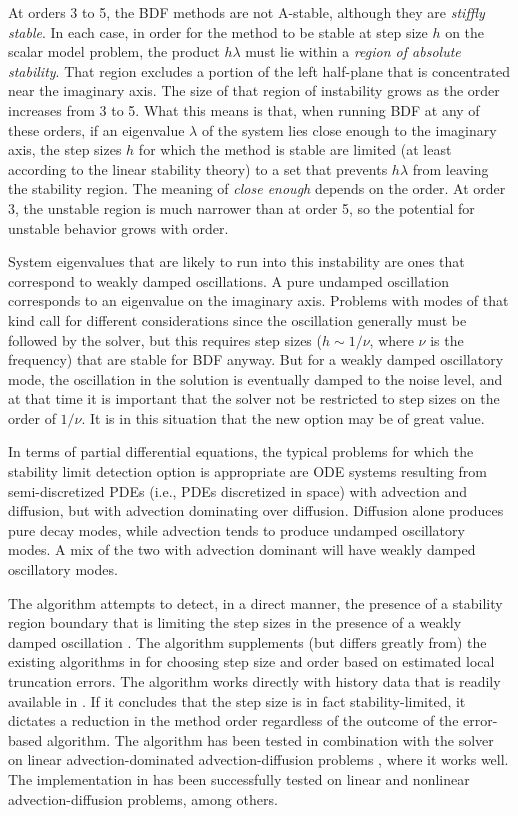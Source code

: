 At orders 3 to 5, the BDF methods are not A-stable, although they are
{\em stiffly stable}. In each case, in order for the method to be stable
at step size $h$ on the scalar model problem, the product $h\lambda$ must
lie within a {\em region of absolute stability}. 
That region excludes a portion of the left half-plane that is concentrated 
near the imaginary axis.  The size of that region of instability grows as the order
increases from 3 to 5.  What this means is that, when running BDF at
any of these orders, if an eigenvalue $\lambda$ of the system lies close
enough to the imaginary axis, the step sizes $h$ for which the method is
stable are limited (at least according to the linear stability theory)
to a set that prevents $h\lambda$ from leaving the stability region.
The meaning of {\em close enough} depends on the order.  
At order 3, the unstable region is much narrower than at order 5, 
so the potential for unstable behavior grows with order.

System eigenvalues that are likely to run into this instability are
ones that correspond to weakly damped oscillations.  A pure undamped
oscillation corresponds to an eigenvalue on the imaginary axis.
Problems with modes of that kind call for different considerations
since the oscillation generally must be followed by the solver, but
this requires step sizes ($h \sim 1/\nu$, where $\nu$ is the frequency) 
that are stable for BDF anyway.  But for a weakly damped oscillatory mode,
the oscillation in the solution is eventually damped to the noise level, 
and at that time it is important that the solver not be restricted to step 
sizes on the order of $1/\nu$.  It is in this situation that the new option may
be of great value.

In terms of partial differential equations, the typical problems for
which the stability limit detection option is appropriate are
ODE systems resulting from semi-discretized PDEs (i.e., PDEs
discretized in space) with advection and diffusion, but with advection dominating
over diffusion. Diffusion alone produces pure decay modes, while advection tends to
produce undamped oscillatory modes.  A mix of the two with advection
dominant will have weakly damped oscillatory modes.

The {\stald} algorithm attempts to detect, in a direct
manner, the presence of a stability region boundary that is limiting
the step sizes in the presence of a weakly damped oscillation \cite{Hin:92}.
The algorithm supplements (but differs greatly from) the existing
algorithms in {\cvodes} for choosing step size and order based on
estimated local truncation errors.  The {\stald} algorithm works directly
with history data that is readily available in {\cvodes}.  If it concludes
that the step size is in fact stability-limited, it dictates a
reduction in the method order regardless of the outcome of the
error-based algorithm.  The {\stald} algorithm has been tested in
combination with the {\vode} solver on linear advection-dominated
advection-diffusion problems \cite{Hin:95}, where it works well.  The
implementation in {\cvodes} has been successfully tested on linear 
and nonlinear advection-diffusion problems, among others.

